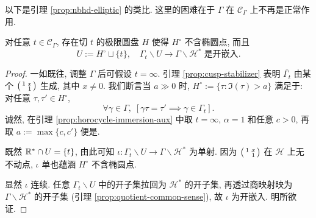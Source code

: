 以下是引理 \ref{prop:nbhd-elliptic} 的类比. 这里的困难在于 $\Gamma$ 在 $\mathcal{C}_\Gamma$ 上不再是正常作用.
\begin{lemma}\label{prop:horocycle-immersion}
	对任意 $t \in \mathcal{C}_\Gamma$, 存在切 $t$ 的极限圆盘 $H$ 使得 $H^\circ$ 不含椭圆点, 而且
	\[ U := H^\circ \sqcup \{t\}, \quad \Gamma_t \backslash U \to \Gamma \backslash \mathcal{H}^* \; \text{是开嵌入}. \]
\end{lemma}
\begin{proof}
	一如既往, 调整 $\Gamma$ 后可假设 $t = \infty$. 引理 \ref{prop:cusp-stabilizer} 表明 $\overline{\Gamma_t}$ 由某个 $\bigl(\begin{smallmatrix} 1 & x \\  & 1 \end{smallmatrix}\bigr)$ 生成, 其中 $x \neq 0$. 我们断言当 $a \gg 0$ 时, $H^\circ := \{\tau: \Im(\tau) > a \}$ 满足于: 对任意 $\tau, \tau' \in H^\circ$,
	\[ \forall \gamma \in \Gamma, \; \left[ \gamma\tau=\tau' \implies \gamma \in \Gamma_t \right]. \]
	诚然, 在引理 \ref{prop:horocycle-immersion-aux} 中取 $t=\infty$, $\alpha=1$ 和任意 $c>0$, 再取 $a := \max\{c,c'\}$ 便是.
	
	既然 $\mathbb{R}^* \cap U = \{t\}$, 由此可知 $\iota: \Gamma_t \backslash U \to \Gamma \backslash \mathcal{H}^*$ 为单射. 因为 $\bigl(\begin{smallmatrix} 1 & x \\  & 1 \end{smallmatrix}\bigr)$ 在 $\mathcal{H}$ 上无不动点, $\iota$ 单也蕴涵 $H^\circ$ 不含椭圆点.
	
	显然 $\iota$ 连续. 任意 $\Gamma_t \backslash U$ 中的开子集拉回为 $\mathcal{H}^*$ 的开子集, 再透过商映射映为 $\Gamma \backslash \mathcal{H}^*$ 的开子集 (引理 \ref{prop:quotient-common-sense}), 故 $\iota$ 为开嵌入. 明所欲证.
\end{proof}

